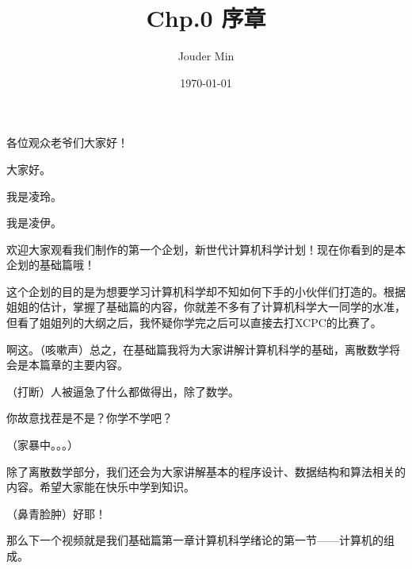 \documentclass{script}
\title{\textbf{Chp.0 序章}}
\author{Jouder Min}
\date{\today}
\begin{document}
\maketitle
\setlength{\parskip}{1em}
\begin{description}[itemsep=1ex,leftmargin=0.92cm]
    \item[凌玲] 各位观众老爷们大家好！
    \item[凌伊] 大家好。
    \item[凌玲] 我是凌玲。
    \item[凌伊] 我是凌伊。
    \item[凌玲] 欢迎大家观看我们制作的第一个企划，新世代计算机科学计划！现在你看到的是本企划的基础篇哦！
    \item[凌伊] 这个企划的目的是为想要学习计算机科学却不知如何下手的小伙伴们打造的。根据姐姐的估计，掌握了基础篇的内容，你就差不多有了计算机科学大一同学的水准，但看了姐姐列的大纲之后，我怀疑你学完之后可以直接去打XCPC的比赛了。
    \item[凌玲] 啊这。（{\kaishu 咳嗽声}）总之，在基础篇我将为大家讲解计算机科学的基础，离散数学将会是本篇章的主要内容。
    \item[凌伊] （{\kaishu 打断}）人被逼急了什么都做得出，除了数学。
    \item[凌玲] 你故意找茬是不是？你学不学吧？
    \item[] （{\kaishu 家暴中。。。}）
    \item[凌玲] 除了离散数学部分，我们还会为大家讲解基本的程序设计、数据结构和算法相关的内容。希望大家能在快乐中学到知识。
    \item[凌伊] （{\kaishu 鼻青脸肿}）好耶！
    \item[凌玲] 那么下一个视频就是我们基础篇第一章计算机科学绪论的第一节——计算机的组成。
\end{description}
\end{document}
